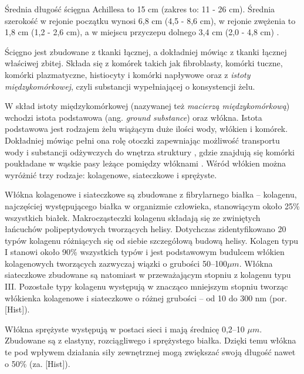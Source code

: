 Średnia długość ścięgna Achillesa to 15 cm (zakres to: 11 - 26 cm). Średnia szerokość w rejonie początku wynosi 6,8 cm (4,5 - 8,6 cm), w rejonie zwężenia to 1,8 cm (1,2 - 2,6 cm), a w miejscu przyczepu dolnego 3,4 cm (2,0 - 4,8 cm) \cite{Doral2010, KoivunenNiemel1995}.

Ścięgno jest zbudowane z tkanki łącznej, a dokładniej mówiąc z tkanki łącznej właściwej zbitej. Składa się z komórek takich jak fibroblasty, komórki tuczne, komórki plazmatyczne, histiocyty i komórki napływowe oraz z \textit{istoty międzykomórkowej}, czyli substancji wypełniającej o konsystencji żelu. 

W skład istoty międzykomórkowej (nazywanej też \textit{macierzą międzykomórkową}) wchodzi istota podstawowa (ang. \textit{ground substance}) oraz włókna. Istota podstawowa jest rodzajem żelu wiążącym duże ilości wody, włókien i komórek. Dokładniej mówiąc pełni ona rolę otoczki zapewniając możliwość transportu wody i substancji odżywczych do wnętrza struktury \cite{Sharma2006}, gdzie znajdują się komórki poukładane w wąskie pasy leżące pomiędzy włóknami \cite{Maffulli2005}. Wśród włókien można wyróżnić trzy rodzaje: kolagenowe, siateczkowe i sprężyste.

Włókna kolagenowe i siateczkowe są zbudowane z fibrylarnego białka -- kolagenu, najczęściej występującego białka w organizmie człowieka, stanowiącym około 25\% wszystkich białek. Makrocząsteczki kolagenu składają się ze zwiniętych łańcuchów polipeptydowych tworzących helisy. Dotychczas zidentyfikowano 20 typów kolagenu różniących się od siebie szczegółową budową helisy. Kolagen typu I stanowi około 90\% wszystkich typów i jest podstawowym budulcem włókien kolagenowych tworzących zazwyczaj wiązki o grubości 50--100$\mu$$m$. Włókna siateczkowe zbudowane są natomiast w przeważającym stopniu z kolagenu typu III. Pozostałe typy kolagenu występują w znacząco mniejszym stopniu tworząc włókienka kolagenowe i siateczkowe o różnej grubości -- od 10 do 300 nm (por. [Hist]).

Włókna sprężyste występują w postaci sieci i mają średnicę 0,2--10 $\mu$$m$. Zbudowane są z elastyny, rozciągliwego i sprężystego białka. Dzięki temu włókna te pod wpływem działania siły zewnętrznej mogą zwiększać swoją długość nawet o 50\% (za. [Hist]). 

